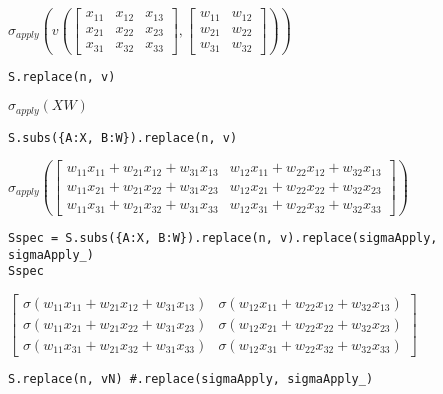 \documentclass[
]{article}
\begin{document}
\(\displaystyle \sigma_{apply}{\left(v{\left(\left[\begin{matrix}x_{11} & x_{12} & x_{13}\\x_{21} & x_{22} & x_{23}\\x_{31} & x_{32} & x_{33}\end{matrix}\right],\left[\begin{matrix}w_{11} & w_{12}\\w_{21} & w_{22}\\w_{31} & w_{32}\end{matrix}\right] \right)} \right)}\)

\begin{verbatim}
S.replace(n, v)
\end{verbatim}

\(\displaystyle \sigma_{apply}{\left(X W \right)}\)

\begin{verbatim}
S.subs({A:X, B:W}).replace(n, v)
\end{verbatim}

\(\displaystyle \sigma_{apply}{\left(\left[\begin{matrix}w_{11} x_{11} + w_{21} x_{12} + w_{31} x_{13} & w_{12} x_{11} + w_{22} x_{12} + w_{32} x_{13}\\w_{11} x_{21} + w_{21} x_{22} + w_{31} x_{23} & w_{12} x_{21} + w_{22} x_{22} + w_{32} x_{23}\\w_{11} x_{31} + w_{21} x_{32} + w_{31} x_{33} & w_{12} x_{31} + w_{22} x_{32} + w_{32} x_{33}\end{matrix}\right] \right)}\)

\begin{verbatim}
Sspec = S.subs({A:X, B:W}).replace(n, v).replace(sigmaApply, sigmaApply_)
Sspec
\end{verbatim}

\(\displaystyle \left[\begin{matrix}\sigma{\left(w_{11} x_{11} + w_{21} x_{12} + w_{31} x_{13} \right)} & \sigma{\left(w_{12} x_{11} + w_{22} x_{12} + w_{32} x_{13} \right)}\\\sigma{\left(w_{11} x_{21} + w_{21} x_{22} + w_{31} x_{23} \right)} & \sigma{\left(w_{12} x_{21} + w_{22} x_{22} + w_{32} x_{23} \right)}\\\sigma{\left(w_{11} x_{31} + w_{21} x_{32} + w_{31} x_{33} \right)} & \sigma{\left(w_{12} x_{31} + w_{22} x_{32} + w_{32} x_{33} \right)}\end{matrix}\right]\)

\begin{verbatim}
S.replace(n, vN) #.replace(sigmaApply, sigmaApply_)
\end{verbatim}
\end{document}
